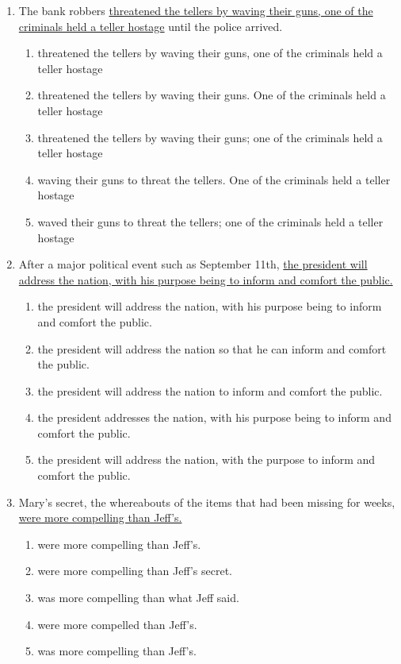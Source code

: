 \begin{enumerate}
\bigskip
\item The bank robbers \ul{threatened the tellers by waving their guns, one of the criminals held a teller hostage} until the police arrived. 

\bigskip
\begin{enumerate}[label=(\Alph*)]
\item threatened the tellers by waving their guns, one of the criminals held a teller hostage \hrulefill
\item threatened the tellers by waving their guns. One of the criminals held a teller hostage\hrulefill
\item threatened the tellers by waving their guns; one of the criminals held a teller hostage\hrulefill
\item waving their guns to threat the tellers. One of the criminals held a teller hostage\hrulefill
\item waved their guns to threat the tellers; one of the criminals held a teller hostage\hrulefill
\end{enumerate}

\bigskip
\item After a major political event such as September 11th, \ul{the president will address the nation, with his purpose being to inform and comfort the public.}

\bigskip
\begin{enumerate}[label=(\Alph*)]
\item the president will address the nation, with his purpose being to inform and comfort the public. \hrulefill
\item the president will address the nation so that he can inform and comfort the public.\hrulefill
\item the president will address the nation to inform and comfort the public.\hrulefill
\item the president addresses the nation, with his purpose being to inform and comfort the public.\hrulefill
\item the president will address the nation, with the purpose to inform and comfort the public.\hrulefill
\end{enumerate}

\bigskip
\item Mary's secret, the whereabouts of the items that had been missing for weeks, \ul{were more compelling than Jeff's.}

\bigskip
\begin{enumerate}[label=(\Alph*)]
\item were more compelling than Jeff's. \hrulefill
\item were more compelling than Jeff's secret. \hrulefill
\item was more compelling than what Jeff said. \hrulefill
\item were more compelled than Jeff's. \hrulefill
\item was more compelling than Jeff's.\hrulefill
\end{enumerate}

\end{enumerate}
